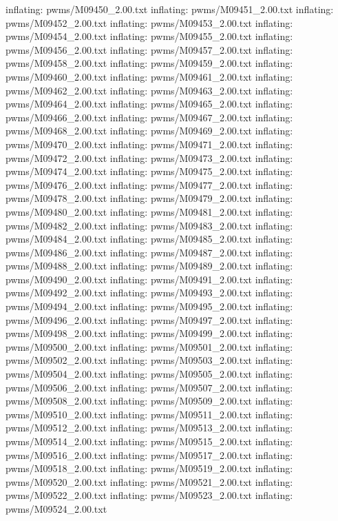 \documentclass[letterpaper,10pt,english]{sphinxmanual}
\begin{document}
{\begin{sphinxVerbatim}[commandchars=\\\{\}]
  inflating: pwms/M09450\_2.00.txt
  inflating: pwms/M09451\_2.00.txt
  inflating: pwms/M09452\_2.00.txt
  inflating: pwms/M09453\_2.00.txt
  inflating: pwms/M09454\_2.00.txt
  inflating: pwms/M09455\_2.00.txt
  inflating: pwms/M09456\_2.00.txt
  inflating: pwms/M09457\_2.00.txt
  inflating: pwms/M09458\_2.00.txt
  inflating: pwms/M09459\_2.00.txt
  inflating: pwms/M09460\_2.00.txt
  inflating: pwms/M09461\_2.00.txt
  inflating: pwms/M09462\_2.00.txt
  inflating: pwms/M09463\_2.00.txt
  inflating: pwms/M09464\_2.00.txt
  inflating: pwms/M09465\_2.00.txt
  inflating: pwms/M09466\_2.00.txt
  inflating: pwms/M09467\_2.00.txt
  inflating: pwms/M09468\_2.00.txt
  inflating: pwms/M09469\_2.00.txt
  inflating: pwms/M09470\_2.00.txt
  inflating: pwms/M09471\_2.00.txt
  inflating: pwms/M09472\_2.00.txt
  inflating: pwms/M09473\_2.00.txt
  inflating: pwms/M09474\_2.00.txt
  inflating: pwms/M09475\_2.00.txt
  inflating: pwms/M09476\_2.00.txt
  inflating: pwms/M09477\_2.00.txt
  inflating: pwms/M09478\_2.00.txt
  inflating: pwms/M09479\_2.00.txt
  inflating: pwms/M09480\_2.00.txt
  inflating: pwms/M09481\_2.00.txt
  inflating: pwms/M09482\_2.00.txt
  inflating: pwms/M09483\_2.00.txt
  inflating: pwms/M09484\_2.00.txt
  inflating: pwms/M09485\_2.00.txt
  inflating: pwms/M09486\_2.00.txt
  inflating: pwms/M09487\_2.00.txt
  inflating: pwms/M09488\_2.00.txt
  inflating: pwms/M09489\_2.00.txt
  inflating: pwms/M09490\_2.00.txt
  inflating: pwms/M09491\_2.00.txt
  inflating: pwms/M09492\_2.00.txt
  inflating: pwms/M09493\_2.00.txt
  inflating: pwms/M09494\_2.00.txt
  inflating: pwms/M09495\_2.00.txt
  inflating: pwms/M09496\_2.00.txt
  inflating: pwms/M09497\_2.00.txt
  inflating: pwms/M09498\_2.00.txt
  inflating: pwms/M09499\_2.00.txt
  inflating: pwms/M09500\_2.00.txt
  inflating: pwms/M09501\_2.00.txt
  inflating: pwms/M09502\_2.00.txt
  inflating: pwms/M09503\_2.00.txt
  inflating: pwms/M09504\_2.00.txt
  inflating: pwms/M09505\_2.00.txt
  inflating: pwms/M09506\_2.00.txt
  inflating: pwms/M09507\_2.00.txt
  inflating: pwms/M09508\_2.00.txt
  inflating: pwms/M09509\_2.00.txt
  inflating: pwms/M09510\_2.00.txt
  inflating: pwms/M09511\_2.00.txt
  inflating: pwms/M09512\_2.00.txt
  inflating: pwms/M09513\_2.00.txt
  inflating: pwms/M09514\_2.00.txt
  inflating: pwms/M09515\_2.00.txt
  inflating: pwms/M09516\_2.00.txt
  inflating: pwms/M09517\_2.00.txt
  inflating: pwms/M09518\_2.00.txt
  inflating: pwms/M09519\_2.00.txt
  inflating: pwms/M09520\_2.00.txt
  inflating: pwms/M09521\_2.00.txt
  inflating: pwms/M09522\_2.00.txt
  inflating: pwms/M09523\_2.00.txt
  inflating: pwms/M09524\_2.00.txt

\end{sphinxVerbatim}}
\end{document}
